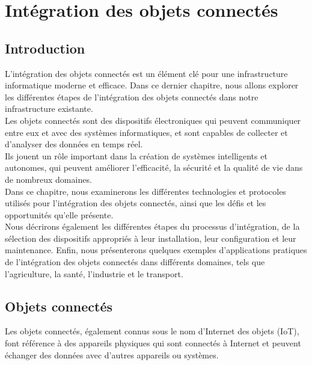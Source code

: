 \chapter{Intégration des objets connectés}

\section{Introduction}

L'intégration des objets connectés est un élément clé pour une infrastructure informatique moderne et efficace. Dans ce dernier chapitre, nous allons explorer les différentes étapes de l'intégration des objets connectés dans notre infrastructure existante. \\

Les objets connectés sont des dispositifs électroniques qui peuvent communiquer entre eux et avec des systèmes informatiques, et sont capables de collecter et d'analyser des données en temps réel. \\

Ils jouent un rôle important dans la création de systèmes intelligents et autonomes, qui peuvent améliorer l'efficacité, la sécurité et la qualité de vie dans de nombreux domaines. \\

Dans ce chapitre, nous examinerons les différentes technologies et protocoles utilisés pour l'intégration des objets connectés, ainsi que les défis et les opportunités qu'elle présente. \\

Nous décrirons également les différentes étapes du processus d'intégration, de la sélection des dispositifs appropriés à leur installation, leur configuration et leur maintenance. Enfin, nous présenterons quelques exemples d'applications pratiques de l'intégration des objets connectés dans différents domaines, tels que l'agriculture, la santé, l'industrie et le transport. \\







\section{Objets connectés}

Les objets connectés, également connus sous le nom d'Internet des objets (IoT), font référence à des appareils physiques qui sont connectés à Internet et peuvent échanger des données avec d'autres appareils ou systèmes. \\

